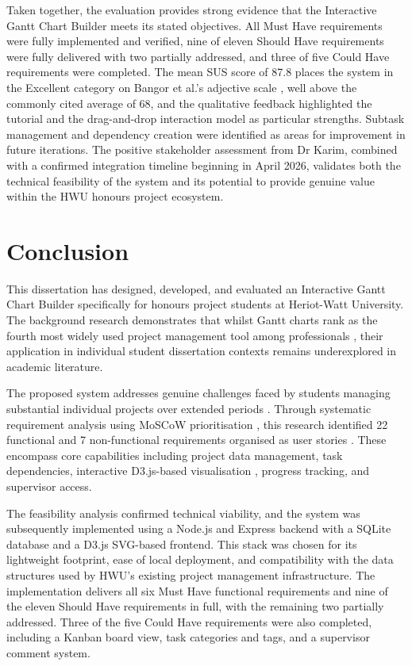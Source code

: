 \documentclass[12pt,nonacm,acmlarge,titlepage,screen]{acmart}
\begin{document}
Taken together, the evaluation provides strong evidence that the Interactive Gantt
Chart Builder meets its stated objectives. All Must Have requirements were fully
implemented and verified, nine of eleven Should Have requirements were fully
delivered with two partially addressed, and three of five Could Have requirements
were completed. The mean SUS score of 87.8 places the system in the Excellent
category on Bangor et al.'s adjective scale \cite{bangor_sus_2009}, well above the
commonly cited average of 68, and the qualitative feedback highlighted the tutorial
and the drag-and-drop interaction model as particular strengths. Subtask management
and dependency creation were identified as areas for improvement in future
iterations. The positive stakeholder assessment from Dr Karim, combined with a
confirmed integration timeline beginning in April 2026, validates both the technical
feasibility of the system and its potential to provide genuine value within the HWU
honours project ecosystem.





\section{Conclusion} \label{cha:conclusion}

This dissertation has designed, developed, and evaluated an Interactive Gantt Chart Builder specifically for honours project students at Heriot-Watt University. The background research demonstrates that whilst Gantt charts rank as the fourth most widely used project management tool among professionals \cite{besner_2008}, their application in individual student dissertation contexts remains underexplored in academic literature.

The proposed system addresses genuine challenges faced by students managing substantial individual projects over extended periods \cite{Shives2015}. Through systematic requirement analysis using MoSCoW prioritisation \cite{moscow_method_2020}, this research identified 22 functional and 7 non-functional requirements organised as user stories \cite{cohn_user_2009}. These encompass core capabilities including project data management, task dependencies, interactive D3.js-based visualisation \cite{geeksforgeeks_d3js_2025}, progress tracking, and supervisor access.

The feasibility analysis confirmed technical viability, and the system was subsequently implemented using a Node.js and Express backend with a SQLite database and a D3.js SVG-based frontend. This stack was chosen for its lightweight footprint, ease of local deployment, and compatibility with the data structures used by HWU's existing project management infrastructure. The implementation delivers all six Must Have functional requirements and nine of the eleven Should Have requirements in full, with the remaining two partially addressed. Three of the five Could Have requirements were also completed, including a Kanban board view, task categories and tags, and a supervisor comment system.
\end{document}
